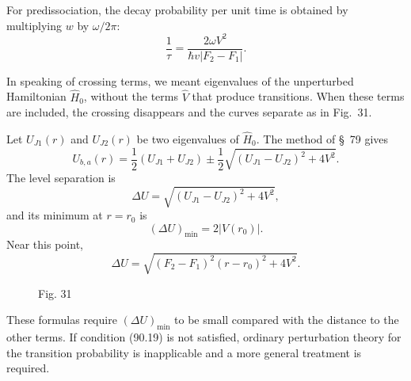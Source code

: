 For predissociation, the decay probability per unit time is obtained by multiplying $w$ by $\omega/2\pi$:
\begin{equation}\frac1\tau=\frac{2\omega V^2}{\hbar v|F_2-F_1|}.\tag{90.8}\end{equation}

In speaking of crossing terms, we meant eigenvalues of the unperturbed Hamiltonian $\widehat H_0$, without the terms $\widehat V$ that produce transitions. When these terms are included, the crossing disappears and the curves separate as in Fig.~31.

Let $U_{J1}(r)$ and $U_{J2}(r)$ be two eigenvalues of $\widehat H_0$. The method of \S~79 gives
\begin{equation}U_{b,a}(r)=\frac12(U_{J1}+U_{J2})\pm\frac12\sqrt{(U_{J1}-U_{J2})^2+4V^2}.\tag{90.9}\end{equation}
The level separation is
\begin{equation}\Delta U=\sqrt{(U_{J1}-U_{J2})^2+4V^2},\tag{90.10}\end{equation}
and its minimum at $r=r_0$ is
\begin{equation}(\Delta U)_{\min}=2|V(r_0)|.\tag{90.11}\end{equation}
Near this point,
\begin{equation}\Delta U=\sqrt{(F_2-F_1)^2(r-r_0)^2+4V^2}.\tag{90.12}\end{equation}

\begin{figure}[ht]
\centering
{}
\caption*{Fig. 31}
\end{figure}

These formulas require $(\Delta U)_{\min}$ to be small compared with the distance to the other terms. If condition (90.19) is not satisfied, ordinary perturbation theory for the transition probability is inapplicable and a more general treatment is required.

